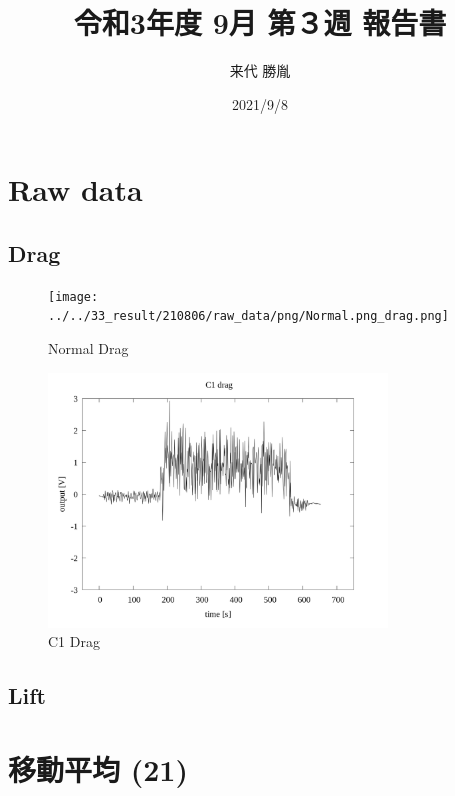 \documentclass[twocolumn,a4j]{jsarticle}
\author{来代 勝胤}
\title{令和3年度 9月 第３週 報告書}
\date{2021/9/8}
\begin{document}
\columnseprule=0.1mm

\section{Raw data}

\subsection{Drag}

\begin{figure}[htbp]
    \footnotesize
    \begin{center}
        \texttt{[image: ../../33\_result/210806/raw\_data/png/Normal.png\_drag.png]}
        \caption{Normal Drag}
    \end{center}
\end{figure}

\begin{figure}[htbp]
    \footnotesize
    \begin{center}
        \includegraphics[width=90mm]{../../33_result/210806/raw_data/png/C1_drag.png}
        \caption{C1 Drag}
    \end{center}
\end{figure}

\subsection{Lift}

\section{移動平均 (21)}
\end{document}
